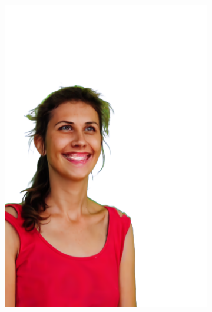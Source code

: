 \begin{figure}[ht]
\begin{subfigure}{0.08\linewidth}
        \includegraphics[width=\textwidth]{Figures/results/high/dora_smile/11_render.png}

\end{subfigure}
\end{figure}

